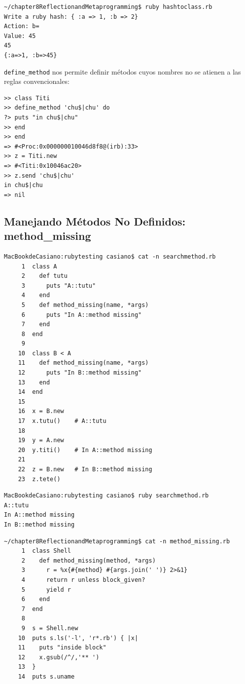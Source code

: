 \begin{verbatim}
~/chapter8ReflectionandMetaprogramming$ ruby hashtoclass.rb 
Write a ruby hash: { :a => 1, :b => 2}
Action: b=
Value: 45
45
{:a=>1, :b=>45}
\end{verbatim}

\verb|define_method| nos permite definir métodos cuyos nombres no se atienen a las reglas convencionales:

\begin{verbatim}
>> class Titi
>> define_method 'chu$|chu' do
?> puts "in chu$|chu"
>> end
>> end
=> #<Proc:0x000000010046d8f8@(irb):33>
>> z = Titi.new
=> #<Titi:0x10046ac20>
>> z.send 'chu$|chu'
in chu$|chu
=> nil
\end{verbatim}

\subsection{Manejando Métodos No Definidos: method\_missing}
\label{seubsection:methodmissing}
\begin{verbatim}
MacBookdeCasiano:rubytesting casiano$ cat -n searchmethod.rb 
     1  class A
     2    def tutu
     3      puts "A::tutu"
     4    end
     5    def method_missing(name, *args)
     6      puts "In A::method missing"
     7    end
     8  end
     9  
    10  class B < A
    11    def method_missing(name, *args)
    12      puts "In B::method missing"
    13    end
    14  end
    15  
    16  x = B.new
    17  x.tutu()    # A::tutu
    18  
    19  y = A.new
    20  y.titi()    # In A::method missing
    21  
    22  z = B.new   # In B::method missing
    23  z.tete()
\end{verbatim}

\begin{verbatim}
MacBookdeCasiano:rubytesting casiano$ ruby searchmethod.rb 
A::tutu
In A::method missing
In B::method missing
\end{verbatim}

\begin{verbatim}
~/chapter8ReflectionandMetaprogramming$ cat -n method_missing.rb 
     1  class Shell
     2    def method_missing(method, *args)
     3      r = %x{#{method} #{args.join(' ')} 2>&1}
     4      return r unless block_given?
     5      yield r 
     6    end
     7  end
     8  
     9  s = Shell.new
    10  puts s.ls('-l', 'r*.rb') { |x|
    11    puts "inside block" 
    12    x.gsub(/^/,'** ')
    13  }
    14  puts s.uname
\end{verbatim}

